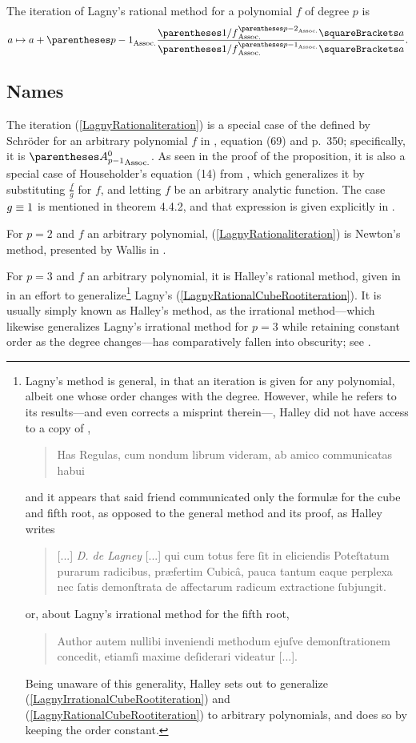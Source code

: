 ﻿\documentclass[10pt, a4paper, twoside]{basestyle}
\begin{document}
\begin{proposition}
The iteration of Lagny’s rational method for a polynomial $f$ of degree $p$ is\begin{equation}
a\mapsto a + \pa{p-1}\frac{\pa{1/f}^{\pa{p-2}}\of{a}}{\pa{1/f}^{\pa{p-1}}\of{a}}\text.\label{LagnyRationaliteration}
\end{equation}
\end{proposition}

\subsection*{Names}
The iteration (\ref{LagnyRationaliteration}) is a special case of the  defined by Schröder for an
arbitrary polynomial $f$ in \cite{Schröder1870}, equation (69) and p.~350; specifically, it is $\pa{A^0_{p-1}}$.
As seen in the proof of the proposition, it is also a special case of Householder’s  equation (14) from \cite[169]{Householder1970},
which generalizes it by substituting $\frac{f}{g}$ for $f$, and letting $f$ be an arbitrary analytic function. The case
$g\equiv1$ is mentioned in theorem 4.4.2, and that expression is given explicitly in \cite{SebahGourdon2001}.

For $p=2$ and $f$ an arbitrary polynomial, (\ref{LagnyRationaliteration}) is Newton's method, presented by Wallis in
\cite[338]{Wallis1685}.

For $p=3$ and $f$ an arbitrary polynomial, it is Halley's rational method, given in \cite[142--143]{Halley1694} in
an effort to generalize\footnote{Lagny's method is general, in that an iteration is given for any
polynomial, albeit one whose order changes with the degree. However, while he refers to its
results---and even corrects a misprint therein---, Halley
did not have access to a copy of \cite{FantetdeLagny1692},
\begin{quote}
Has Regulas, cum nondum librum videram, ab amico communicatas habui
\end{quote}
and it appears that said friend communicated only the formulæ for the cube and fifth root, as opposed to the
general method and its proof, as Halley writes
\begin{quote}
[...] \emph{D. de Lagney} [...] qui cum totus fere ſit in eliciendis Poteſtatum purarum radicibus,
præfertim Cubicâ, pauca tantum eaque perplexa nec ſatis demonſtrata de affectarum radicum
extractione ſubjungit.
\end{quote}
or, about Lagny's irrational method for the fifth root,
\begin{quote}
Author autem nullibi inveniendi methodum ejuſve demonſtrationem concedit,
etiamſi maxime deſiderari videatur [...].
\end{quote}
Being unaware of this generality, Halley sets out to generalize (\ref{LagnyIrrationalCubeRootiteration}) and (\ref{LagnyRationalCubeRootiteration}) to
arbitrary polynomials, and does so by keeping the order constant.} Lagny's (\ref{LagnyRationalCubeRootiteration}).
It is usually simply known as Halley's method, as the irrational method---which likewise generalizes Lagny's irrational
method for $p=3$ while retaining constant order as the degree changes---has comparatively fallen into obscurity;
see \cite{ScavoThoo1995}.
\end{document}
